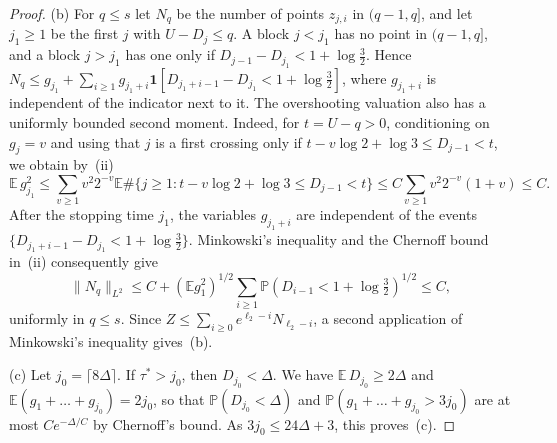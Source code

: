 \documentclass[12pt]{amsart}
\theoremstyle{definition}
\theoremstyle{remark}
\begin{document}
\begin{proof}
(b) For $q\le s$ let $N_q$ be the number of points $z_{j,i}$ in $(q-1,q]$, and let $j_1\ge1$ be the first $j$ with $U-D_j\le q$. A block $j<j_1$ has no point in $(q-1,q]$, and a block $j>j_1$ has one only if $D_{j-1}-D_{j_1}<1+\log\tfrac32$. Hence $N_q\le g_{j_1}+\sum_{i\ge1}g_{j_1+i}\mathbf 1[D_{j_1+i-1}-D_{j_1}<1+\log\tfrac32]$, where $g_{j_1+i}$ is independent of the indicator next to it. The overshooting valuation also has a uniformly bounded second
moment. Indeed, for $t=U-q>0$, conditioning on $g_j=v$ and using
that $j$ is a first crossing only if
$t-v\log2+\log3\le D_{j-1}<t$, we obtain by~(ii)
\[
\mathbb E\,g_{j_1}^2
\le\sum_{v\ge1}v^2 2^{-v}
\mathbb E\#\{j\ge1:t-v\log2+\log3\le D_{j-1}<t\}
\le C\sum_{v\ge1}v^2 2^{-v}(1+v)\le C.
\]
After the stopping time $j_1$, the variables $g_{j_1+i}$ are
independent of the events
$\{D_{j_1+i-1}-D_{j_1}<1+\log\tfrac32\}$.
Minkowski's inequality and the Chernoff bound in~(ii) consequently give
\[
\|N_q\|_{L^2}
\le C+(\mathbb E g_1^2)^{1/2}
\sum_{i\ge1}\mathbb P(D_{i-1}<1+\log\tfrac32)^{1/2}
\le C,
\]
uniformly in $q\le s$. Since
$Z\le\sum_{i\ge0}e^{\ell_2-i}N_{\ell_2-i}$, a second
application of Minkowski's inequality gives~(b).

(c) Let $j_0=\lceil8\Delta\rceil$. If $\tau^*>j_0$, then $D_{j_0}<\Delta$. We have $\mathbb E\,D_{j_0}\ge2\Delta$ and $\mathbb E(g_1+\dots+g_{j_0})=2j_0$, so that $\mathbb P(D_{j_0}<\Delta)$ and $\mathbb P(g_1+\dots+g_{j_0}>3j_0)$ are at most $Ce^{-\Delta/C}$ by Chernoff's bound. As $3j_0\le24\Delta+3$, this proves~(c).
\end{proof}
\end{document}
